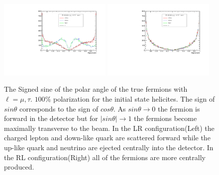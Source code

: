 \begin{figure}

\label{fig:fangles}
\includegraphics[width=0.48\textwidth]{hsLR.pdf}
\includegraphics[width=0.48\textwidth]{hsRL.pdf}
\caption{The Signed sine of the polar angle of the true fermions with $\ell = \mu,\tau$. $100\%$ polarization for the initial state helicites. The sign of $sin\theta$ corresponds to the sign of $cos\theta$. As $sin\theta \rightarrow 0$ the fermion is forward in the detector but for $|sin\theta| \rightarrow 1$ the fermions become maximally transverse to the beam. In the LR configuration(Left) the charged lepton and down-like quark are scattered forward while the up-like quark and neutrino are ejected centrally into the detector. In the RL configuration(Right) all of the fermions are more centrally produced. }
\end{figure}

